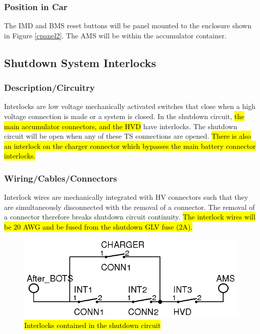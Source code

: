 \documentclass{article}
\DeclareRobustCommand{\hlr}[1]{{\sethlcolor{red}\hl{#1}}}
\begin{document}
        \subsubsection{Position in Car}

            The IMD and BMS reset buttons will be panel mounted to the enclosure shown in Figure \ref{cpanel2}. The AMS will be within the accumulator container.

    \subsection{Shutdown System Interlocks} \label{interlocks}

        \subsubsection{Description/Circuitry}

            Interlocks are low voltage mechanically activated switches that close when a high voltage connection is made or a system is closed.  In the shutdown circuit, \hlr{the main accumulator connectors, and the HVD} have interlocks. The shutdown circuit will be open when any of these TS connections are opened. \hlr{There is also an interlock on the charger connector which bypasses the main battery connector interlocks.}

        \subsubsection{Wiring/Cables/Connectors}

            Interlock wires are mechanically integrated with HV connectors such that they are simultaneously disconnected with the removal of a connector. The removal of a connector therefore breaks shutdown circuit continuity. \hlr{The interlock wires will be 20 AWG and be fused from the shutdown GLV fuse (2A).}

            \begin{figure}[H]
                \centering
                \includegraphics{interlocks}
                \caption{\hlr{Interlocks contained in the shutdown circuit}}
                \label{interlockschem}
            \end{figure}
\end{document}
